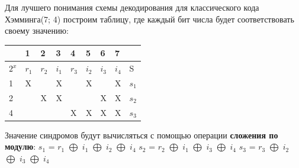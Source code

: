 	\begin{flushleft}
		\small Для лучшего понимания схемы декодирования для классического кода Хэмминга(7; 4) построим таблицу, где каждый бит числа будет соответствовать своему значению:
	\end{flushleft}

	\begin{tabular}{|p{5mm}|p{5mm}|p{5mm}|p{5mm}|p{5mm}|p{5mm}|p{5mm}|p{5mm}|p{5mm}|}
		\hline
		& 1 & 2 & 3 & 4 & 5 & 6 & 7 & \\
		\hline
		$2^x$ & $r_1$ & $r_2$ & $i_1$ & $r_3$ & $i_2$ & $i_3$ & $i_4$ & S \\
		\hline
		1 & X & & X & & X & & X & $s_1$ \\
		\hline
		2 & & X & X & & & X & X & $s_2$ \\
		\hline
		4 & & & & X & X & X & X & $s_3$ \\
		\hline
	\end{tabular}
	\vspace*{5mm}
	
	\begin{flushleft}
		\small Значение синдромов будут вычисляться с помощью операции \textbf{сложения по модулю}:
		\linebreak
		$s_1$ = $r_1$ $\bigoplus$ $i_1$ $\bigoplus$ $i_2$ $\bigoplus$ $i_4$
		\linebreak
		$s_2$ = $r_2$ $\bigoplus$ $i_1$ $\bigoplus$ $i_3$ $\bigoplus$ $i_4$
		\linebreak
		$s_3$ = $r_3$ $\bigoplus$ $i_2$ $\bigoplus$ $i_3$ $\bigoplus$ $i_4$
		\linebreak
		
	\end{flushleft}

